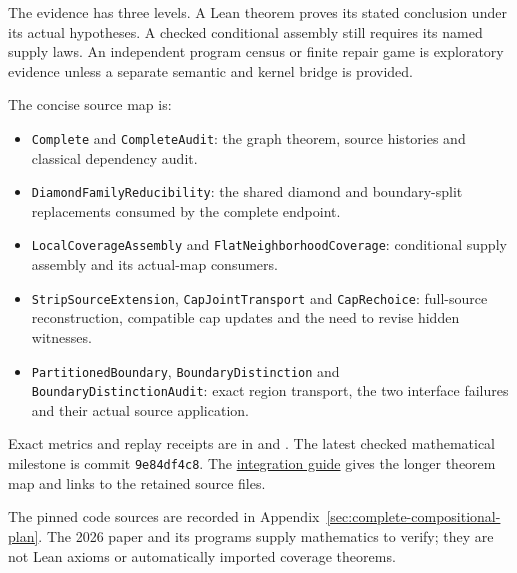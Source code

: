 The evidence has three levels. A Lean theorem proves its stated conclusion
under its actual hypotheses. A checked conditional assembly still requires
its named supply laws. An independent program census or finite repair game
is exploratory evidence unless a separate semantic and kernel bridge is
provided.

The concise source map is:
\begin{itemize}
\item \texttt{Complete} and \texttt{CompleteAudit}: the graph theorem,
source histories and classical dependency audit.
\item \texttt{DiamondFamilyReducibility}: the shared diamond and
boundary-split replacements consumed by the complete endpoint.
\item \texttt{LocalCoverageAssembly} and \texttt{FlatNeighborhoodCoverage}:
conditional supply assembly and its actual-map consumers.
\item \texttt{StripSourceExtension}, \texttt{CapJointTransport} and
\texttt{CapRechoice}: full-source reconstruction, compatible cap updates
and the need to revise hidden witnesses.
\item \texttt{PartitionedBoundary}, \texttt{BoundaryDistinction} and
\texttt{BoundaryDistinctionAudit}: exact region transport, the two
interface failures and their actual source application.
\end{itemize}

Exact metrics and replay receipts are in
 and
.
The latest checked mathematical milestone is commit \texttt{9e84df4c8}.
The \href{fourcolor-compositional/README.md}{integration guide} gives the
longer theorem map and links to the retained source files.

The pinned code sources are recorded in
Appendix~\ref{sec:complete-compositional-plan}. The 2026 paper and its
programs supply mathematics to verify; they are not Lean axioms or
automatically imported coverage theorems.
